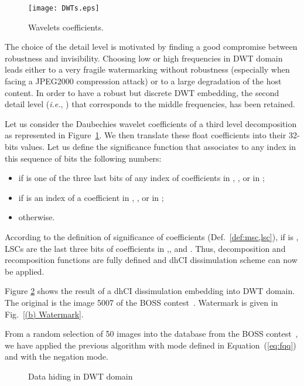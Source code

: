 \documentclass{comjnl}
\begin{document}
\begin{figure}[htb]
\centerline{
\texttt{[image: DWTs.eps]}
}
\caption{Wavelets coefficients.}
\label{fig:DWTs}
\end{figure}






The choice of the detail level is motivated by finding
a good compromise between robustness and invisibility.
Choosing low or high frequencies in DWT domain leads either to a very
fragile watermarking without robustness (especially when facing a
JPEG2000 compression attack) or to a large degradation of the host
content. 
In order to have a robust but discrete DWT embedding, 
the second detail level 
(\textit{i.e.}, ) 
that corresponds to the middle frequencies,
has been retained.






Let us consider the Daubechies wavelet coefficients of a third
level decomposition as represented in Figure~\ref{fig:DWTs}. 
We then translate these float coefficients into their 32-bits values.
Let us define the  significance function  that associates to any index  in this sequence of bits the following numbers:
\begin{itemize}
\item  if  is one of the three last bits of any index of
  coefficients in  , , or in ;
\item  if  is an index of a coefficient in  
  , , or in ;
\item  otherwise.
\end{itemize}

According to the definition of significance of coefficients 
(Def.~\ref{def:msc,lsc}), if  is ,  LSCs are the
last three bits of coefficients in 
,, and .
Thus, decomposition and recomposition functions are fully defined
and dhCI dissimulation scheme can now be applied.

Figure \ref{fig:DWT} shows the result of a
dhCI dissimulation embedding into DWT domain. 
The original is the image 5007 of the BOSS contest~\cite{Boss10}.
Watermark  is given in Fig.~\ref{(b) Watermark}.


From a random selection of 50 images into the database from the BOSS 
contest~\cite{Boss10}, we have applied the previous algorithm with mode  
defined in Equation~(\ref{eq:fqq}) and with the negation mode. 

\begin{figure}[ht]
  \centering
{}\hspace{1cm}

\hspace{1cm}


\caption{Data hiding in DWT domain}
\label{fig:DWT}
\end{figure}
\end{document}

